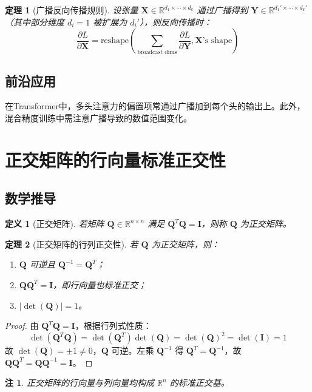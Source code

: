 \documentclass[UTF8, 10pt]{ctexart}
\newtheorem{theorem}{定理}[section]
\newtheorem{definition}{定义}[section]
\newtheorem{remark}{注}[section]
\newcommand{\R}{\mathbb{R}}
\begin{document}
\begin{theorem}[广播反向传播规则]
设张量 $\bm{X} \in \R^{d_1 \times \cdots \times d_k}$ 通过广播得到 $\bm{Y} \in \R^{d_1' \times \cdots \times d_k'}$（其中部分维度 $d_i = 1$ 被扩展为 $d_i'$），则反向传播时：
\[
\frac{\partial L}{\partial \bm{X}} = \text{reshape}\left(\sum_{\text{broadcast dims}} \frac{\partial L}{\partial \bm{Y}}, \bm{X}\text{'s shape}\right)
\]
\end{theorem}

\subsection{前沿应用}
在Transformer中，多头注意力的偏置项常通过广播加到每个头的输出上。此外，混合精度训练中需注意广播导致的数值范围变化。

\section{正交矩阵的行向量标准正交性}
\subsection{数学推导}
\begin{definition}[正交矩阵]
若矩阵 $\bm{Q} \in \R^{n \times n}$ 满足 $\bm{Q}^T \bm{Q} = \bm{I}$，则称 $\bm{Q}$ 为正交矩阵。
\end{definition}

\begin{theorem}[正交矩阵的行列正交性]
若 $\bm{Q}$ 为正交矩阵，则：
\begin{enumerate}
    \item $\bm{Q}$ 可逆且 $\bm{Q}^{-1} = \bm{Q}^T$；
    \item $\bm{Q} \bm{Q}^T = \bm{I}$，即行向量也标准正交；
    \item $|\det(\bm{Q})| = 1$。
\end{enumerate}
\end{theorem}

\begin{proof}
由 $\bm{Q}^T \bm{Q} = \bm{I}$，根据行列式性质：
\[
\det(\bm{Q}^T \bm{Q}) = \det(\bm{Q}^T) \det(\bm{Q}) = \det(\bm{Q})^2 = \det(\bm{I}) = 1
\]
故 $\det(\bm{Q}) = \pm 1 \neq 0$，$\bm{Q}$ 可逆。左乘 $\bm{Q}^{-1}$ 得 $\bm{Q}^T = \bm{Q}^{-1}$，故 $\bm{Q} \bm{Q}^T = \bm{Q} \bm{Q}^{-1} = \bm{I}$。
\end{proof}

\begin{remark}
正交矩阵的行向量与列向量均构成 $\R^n$ 的标准正交基。
\end{remark}
\end{document}
